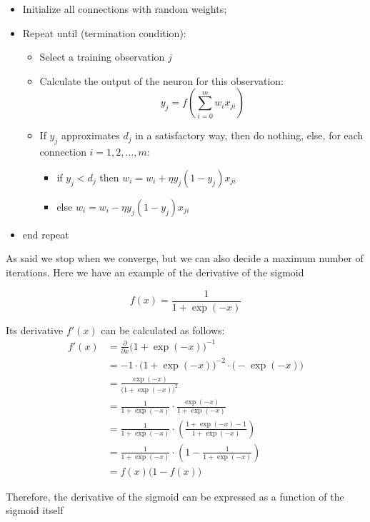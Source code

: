 \begin{itemize}
    \item Initialize all connections with random weights;
    \item Repeat until (termination condition):
    \begin{itemize}
        \item Select a training observation $j$
        \item Calculate the output of the neuron for this observation:
        \[
        y_j = f \left( \sum_{i=0}^{m} w_i x_{ji} \right)
        \]
        \item If $y_j$ approximates $d_j$ in a satisfactory way, then do nothing, else, for each connection $i = 1, 2, \dots, m$:
        \begin{itemize}
            \item if $y_j < d_j$ then $w_i = w_i + \eta y_j (1 - y_j) x_{ji}$
            \item else $w_i = w_i - \eta y_j (1 - y_j) x_{ji}$
        \end{itemize}
    \end{itemize}
    \item end repeat
\end{itemize}

As said we stop when we converge, but we can also decide a maximum number of iterations. Here we have an example of the derivative of the sigmoid


\[
f(x) = \frac{1}{1 + \exp(-x)}
\]

Its derivative $f'(x)$ can be calculated as follows:
\begin{align*}
f'(x) &= \frac{\partial}{\partial x} \big(1 + \exp(-x)\big)^{-1} \\[1ex]
&= -1 \cdot \big(1 + \exp(-x)\big)^{-2} \cdot \big(-\exp(-x)\big) \\[1ex]
&= \frac{\exp(-x)}{\big(1 + \exp(-x)\big)^2} \\[1ex]
&= \frac{1}{1 + \exp(-x)} \cdot \frac{\exp(-x)}{1 + \exp(-x)} \\[1ex]
&= \frac{1}{1 + \exp(-x)} \cdot \left( \frac{1 + \exp(-x) - 1}{1 + \exp(-x)} \right) \\[1ex]
&= \frac{1}{1 + \exp(-x)} \cdot \left( 1 - \frac{1}{1 + \exp(-x)} \right) \\[1ex]
&= f(x)\big(1 - f(x)\big)
\end{align*}

Therefore, the derivative of the sigmoid can be expressed as a function of the sigmoid itself

